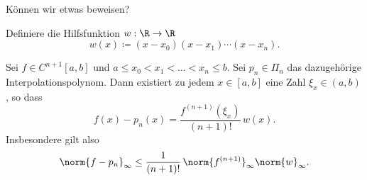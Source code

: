 Können wir etwas beweisen?

\medskip

Definiere die Hilfsfunktion $w:\R\to\R$
\begin{equation*}
 w(x) \coloneqq (x-x_0)(x-x_1)\cdots (x-x_n).
\end{equation*}

\begin{satz}
\label{thm:interpolation:interpolation_error}
 Sei $f\in C^{n+1}[a,b]$ und $a \leq x_0 < x_1 < \hdots < x_n \leq b$. Sei $p_n\in\Pi_n$ das dazugehörige Interpolationspolynom. Dann existiert zu jedem $x\in[a,b]$ eine Zahl $\xi_x\in(a,b)$, so dass
 \begin{equation} \label{eq:interpolation1}
    f(x) - p_n(x) = \frac{f^{(n+1)} (\xi_x)}{(n+1)!} \, w(x).
 \end{equation}
 Insbesondere gilt also
 \begin{equation*}
    \norm{ f - p_n}_\infty \leq \frac{1}{(n+1)!}\, \norm{ f^{(n+1)}}_\infty \norm{w}_\infty.
 \end{equation*}
\end{satz}


